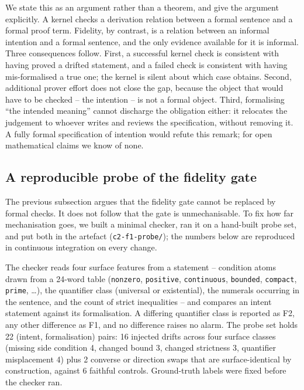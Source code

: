 \documentclass[11pt]{article}
\theoremstyle{plain}
\theoremstyle{definition}
\begin{document}
We state this as an argument rather than a theorem, and give the argument explicitly. A
kernel checks a derivation relation between a formal sentence and a formal proof term.
Fidelity, by contrast, is a relation between an informal intention and a formal sentence, and
the only evidence available for it is informal. Three consequences follow. First, a successful
kernel check is consistent with having proved a drifted statement, and a failed check is
consistent with having mis-formalised a true one; the kernel is silent about which case obtains.
Second, additional prover effort does not close the gap, because the object that would have to
be checked -- the intention -- is not a formal object. Third, formalising ``the intended
meaning'' cannot discharge the obligation either: it relocates the judgement to whoever writes
and reviews the specification, without removing it. A fully formal specification of intention
would refute this remark; for open mathematical claims we know of none.

\subsection{A reproducible probe of the fidelity gate}
\label{sec:probe}

The previous subsection argues that the fidelity gate cannot be replaced by formal checks. It
does not follow that the gate is unmechanisable. To fix how far mechanisation goes, we built a
minimal checker, ran it on a hand-built probe set, and put both in the artefact
(\texttt{c2-f1-probe/}); the numbers below are reproduced in continuous integration on every
change.

The checker reads four surface features from a statement -- condition atoms drawn from a 24-word
table (\texttt{nonzero}, \texttt{positive}, \texttt{continuous}, \texttt{bounded},
\texttt{compact}, \texttt{prime}, \ldots), the quantifier class (universal or existential), the
numerals occurring in the sentence, and the count of strict inequalities -- and compares an intent
statement against its formalisation. A differing quantifier class is reported as F2, any other
difference as F1, and no difference raises no alarm. The probe set holds 22 (intent, formalisation)
pairs: 16 injected drifts across four surface classes (missing side condition 4, changed bound 3,
changed strictness 3, quantifier misplacement 4) plus 2 converse or direction swaps that are
surface-identical by construction, against 6 faithful controls. Ground-truth labels were fixed
before the checker ran.
\end{document}
